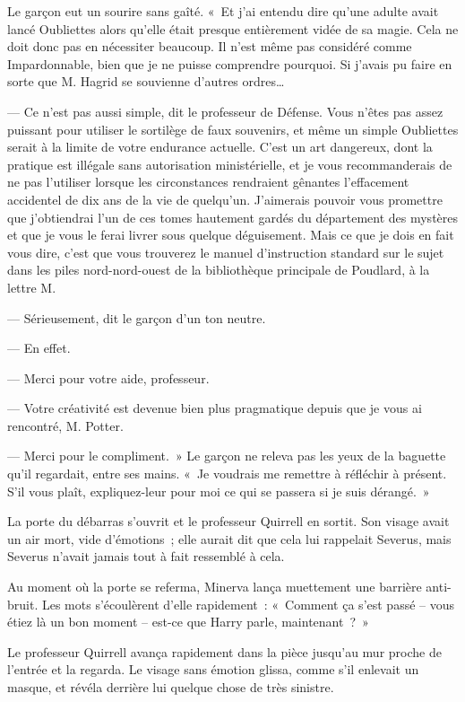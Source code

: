 Le garçon eut un sourire sans gaîté.
«~Et j'ai entendu dire qu'une adulte avait lancé Oubliettes alors qu'elle était presque entièrement vidée de sa magie.
Cela ne doit donc pas en nécessiter beaucoup.
Il n'est même pas considéré comme Impardonnable, bien que je ne puisse comprendre pourquoi.
Si j'avais pu faire en sorte que M. Hagrid se souvienne d'autres ordres…

--- Ce n'est pas aussi simple, dit le professeur de Défense.
Vous n'êtes pas assez puissant pour utiliser le sortilège de faux souvenirs, et même un simple Oubliettes serait à la limite de votre endurance actuelle.
C'est un art dangereux, dont la pratique est illégale sans autorisation ministérielle, et je vous recommanderais de ne pas l'utiliser lorsque les circonstances rendraient gênantes l'effacement accidentel de dix ans de la vie de quelqu'un.
J'aimerais pouvoir vous promettre que j'obtiendrai l'un de ces tomes hautement gardés du département des mystères et que je vous le ferai livrer sous quelque déguisement.
Mais ce que je dois en fait vous dire, c'est que vous trouverez le manuel d'instruction standard sur le sujet dans les piles nord-nord-ouest de la bibliothèque principale de Poudlard, à la lettre M.

--- Sérieusement, dit le garçon d'un ton neutre.

--- En effet.

--- Merci pour votre aide, professeur.

--- Votre créativité est devenue bien plus pragmatique depuis que je vous ai rencontré, M. Potter.

--- Merci pour le compliment.~»
Le garçon ne releva pas les yeux de la baguette qu'il regardait, entre ses mains.
«~Je voudrais me remettre à réfléchir à présent.
S'il vous plaît, expliquez-leur pour moi ce qui se passera si je suis dérangé.~»

\later

La porte du débarras s'ouvrit et le professeur Quirrell en sortit.
Son visage avait un air mort, vide d'émotions~; elle aurait dit que cela lui rappelait Severus, mais Severus n'avait jamais tout à fait ressemblé à cela.

Au moment où la porte se referma, Minerva lança muettement une barrière anti-bruit.
Les mots s'écoulèrent d'elle rapidement~: «~Comment ça s'est passé -- vous étiez là un bon moment -- est-ce que Harry parle, maintenant~?~»

Le professeur Quirrell avança rapidement dans la pièce jusqu'au mur proche de l'entrée et la regarda.
Le visage sans émotion glissa, comme s'il enlevait un masque, et révéla derrière lui quelque chose de très sinistre.

